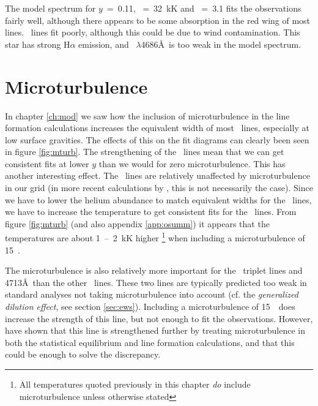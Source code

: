 The model spectrum for $y$~=~0.11, \teff~=~32~kK and
\logg~=~3.1 fits the observations fairly well, although there appears
to be some absorption in the red wing of most lines. \hi\ lines fit
poorly, although this could be due to wind contamination. This
star has strong H$\alpha$ emission, and \heii~$\lambda$4686\AA\
is too weak in the model spectrum.

\section{Microturbulence}
\label{sec:analyses:mturb}

In chapter \ref{ch:mod} we saw how the inclusion of microturbulence in
the line formation calculations increases the equivalent width of most
\hei\ lines, especially at low surface gravities. The effects of this on the
fit diagrams can clearly been seen in figure \ref{fig:mturb}. The
strengthening of the \hei\ lines mean that we can get consistent fits
at lower $y$ than we would for zero microturbulence. This has another
interesting effect. The \heii\ lines are relatively unaffected by
microturbulence in our grid (in more recent calculations by
\cite{sm:98}, this is not necessarily the case). Since we have to
lower the helium abundance to match equivalent widths for the \hei\
lines, we have to increase the temperature to get consistent fits for
the \heii\ lines. From figure \ref{fig:mturb} (and also appendix
\ref{app:osumm}) it appears that the temperatures are about 1~--~2~kK
higher%
\footnote{All temperatures quoted previously in this chapter \emph{do}
include microturbulence unless otherwise stated}
%
when including a microturbulence of 15~\kms.

\begin{sidewaysfigure} %
\epsfysize=13cm
\caption[Fit diagrams showing dependence on microturbulence]
{\fcfont Series of fit diagrams for HD~218915 (O9.5 Iab) showing
dependence on microturbulence, $\xi$, and helium abundance,
$y$. Microturbulence increases from left to right (0, 5, 10, 15~\kms)
and helium abundance from top to bottom (0.08, 0.10, 0.12).}
\label{fig:mturb}
\end{sidewaysfigure} %

The microturbulence is also relatively more important for the \hei\
triplet lines \lam{} and 4713\AA\ than the other \hei\
lines. These two lines are typically predicted too weak in standard
analyses not taking microturbulence into account
(cf. the \emph{generalized dilution effect}, see section \ref{sec:ews}).
Including a microturbulence of 15~\kms\ does increase the strength of
this line, but not enough to fit the observations. However,
\ybcite{sm:98} have shown that this line is
strengthened further by treating microturbulence in both the
statistical equilibrium and line formation calculations, and that this
could be enough to solve the discrepancy.

